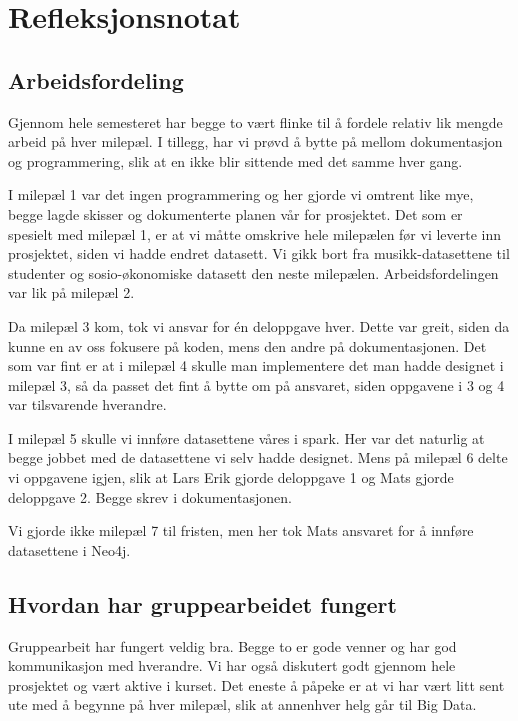 \section{Refleksjonsnotat}
\subsection{Arbeidsfordeling}
Gjennom hele semesteret har begge to vært flinke til å fordele relativ lik mengde arbeid på hver milepæl. I tillegg, har vi prøvd å bytte på mellom dokumentasjon og programmering, slik at en ikke blir sittende med det samme hver gang.

I milepæl 1 var det ingen programmering og her gjorde vi omtrent like mye, begge lagde skisser og dokumenterte planen vår for prosjektet. Det som er spesielt med milepæl 1, er at vi måtte omskrive hele milepælen før vi leverte inn prosjektet, siden vi hadde endret datasett. Vi gikk bort fra musikk-datasettene til studenter og sosio-økonomiske datasett den neste milepælen. Arbeidsfordelingen var lik på milepæl 2.

Da milepæl 3 kom, tok vi ansvar for én deloppgave hver. Dette var greit, siden da kunne en av oss fokusere på koden, mens den andre på dokumentasjonen. Det som var fint er at i milepæl 4 skulle man implementere det man hadde designet i milepæl 3, så da passet det fint å bytte om på ansvaret, siden oppgavene i 3 og 4 var tilsvarende hverandre.

I milepæl 5 skulle vi innføre datasettene våres i spark. Her var det naturlig at begge jobbet med de datasettene vi selv hadde designet. Mens på milepæl 6 delte vi oppgavene igjen, slik at Lars Erik gjorde deloppgave 1 og Mats gjorde deloppgave 2. Begge skrev i dokumentasjonen.

Vi gjorde ikke milepæl 7 til fristen, men her tok Mats ansvaret for å innføre datasettene i Neo4j.

\subsection{Hvordan har gruppearbeidet fungert}
Gruppearbeit har fungert veldig bra. Begge to er gode venner og har god kommunikasjon med hverandre. Vi har også diskutert godt gjennom hele prosjektet og vært aktive i kurset. Det eneste å påpeke er at vi har vært litt sent ute med å begynne på hver milepæl, slik at annenhver helg går til Big Data.